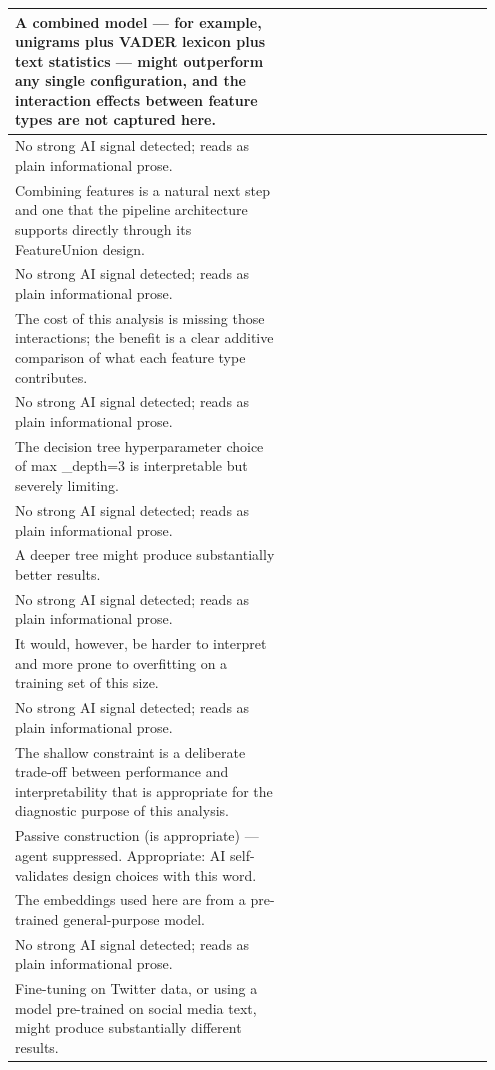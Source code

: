 \documentclass[11pt]{article}
\begin{document}
\begin{longtable}{|p{0.55\linewidth}|p{0.40\linewidth}|}
\hline
A combined model --- for example, unigrams plus VADER lexicon plus text statistics --- might outperform any single configuration, and the interaction effects between feature types are not captured here. & \\[2pt]
\hline
No strong AI signal detected; reads as plain informational prose. & \\
\hline
Combining features is a natural next step and one that the pipeline architecture supports directly through its FeatureUnion design. & \\[2pt]
\hline
No strong AI signal detected; reads as plain informational prose. & \\
\hline
The cost of this analysis is missing those interactions; the benefit is a clear additive comparison of what each feature type contributes. & \\[2pt]
\hline
No strong AI signal detected; reads as plain informational prose. & \\
\hline
The decision tree hyperparameter choice of max \_depth=3 is interpretable but severely limiting. & \\[2pt]
\hline
No strong AI signal detected; reads as plain informational prose. & \\
\hline
A deeper tree might produce substantially better results. & \\[2pt]
\hline
No strong AI signal detected; reads as plain informational prose. & \\
\hline
It would, however, be harder to interpret and more prone to overfitting on a training set of this size. & \\[2pt]
\hline
No strong AI signal detected; reads as plain informational prose. & \\
\hline
The shallow constraint is a deliberate trade-off between performance and interpretability that is appropriate for the diagnostic purpose of this analysis. & \\[2pt]
\hline
Passive construction (is appropriate) --- agent suppressed. Appropriate: AI self-validates design choices with this word. & \\
\hline
The embeddings used here are from a pre-trained general-purpose model. & \\[2pt]
\hline
No strong AI signal detected; reads as plain informational prose. & \\
\hline
Fine-tuning on Twitter data, or using a model pre-trained on social media text, might produce substantially different results. & \\[2pt]
\hline

\end{longtable}
\end{document}
